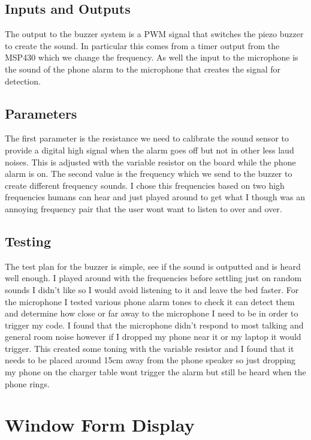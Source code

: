 \documentclass[11pt]{article}
\begin{document}
\subsection*{Inputs and Outputs}
The output to the buzzer system is a PWM signal that switches the piezo buzzer to create the sound.
In particular this comes from a timer output from the MSP430 which we change the frequency. 
As well the input to the microphone is the sound of the phone alarm to the microphone that creates the signal for detection.

\subsection*{Parameters}
The first parameter is the resistance we need to calibrate the sound sensor to provide a digital high signal when the alarm goes off but not in other less laud noises.
This is adjusted with the variable resistor on the board while the phone alarm is on. 
The second value is the frequency which we send to the buzzer to create different frequency sounds.
I chose this frequencies based on two high frequencies humans can hear and just played around to get what I though was an annoying frequency pair that the user wont want to listen to over and over.    

\subsection*{Testing}
The test plan for the buzzer is simple, see if the sound is outputted and is heard well enough. 
I played around with the frequencies before settling just on random sounds I didn't like so I would avoid listening to it and leave the bed faster.
For the microphone I tested various phone alarm tones to check it can detect them and determine how close or far away to the microphone I need to be in order to trigger my code. 
I found that the microphone didn't respond to most talking and general room noise however if I dropped my phone near it or my laptop it would trigger.  
This created some toning with the variable resistor and I found that it needs to be placed around 15cm away from the phone speaker so just dropping my phone on the charger table wont trigger the alarm but still be heard when the phone rings.
 
\section{Window Form Display}
\end{document}

